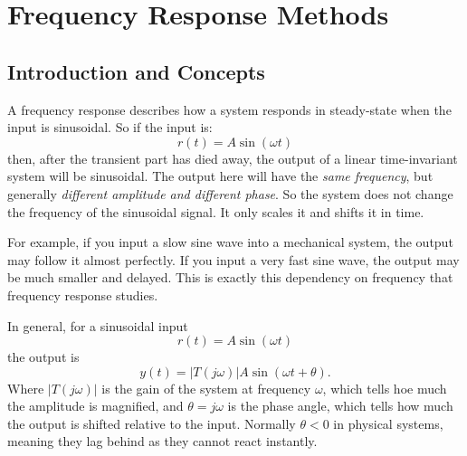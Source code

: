 
\section{Frequency Response Methods}

\subsection{Introduction and Concepts}
A frequency response describes how a system responds in steady-state when the input is sinusoidal.
So if the input is:
\begin{equation*}
  r(t) = A \sin \left( \omega t \right)
\end{equation*}
then, after the transient part has died away, the output of a linear time-invariant system will be sinusoidal.
The output here will have the \textit{same frequency}, but generally \textit{different amplitude and different phase}.
So the system does not change the frequency of the sinusoidal signal.
It only scales it and shifts it in time.

For example, if you input a slow sine wave into a mechanical system, the output may follow it almost perfectly.
If you input a very fast sine wave, the output may be much smaller and delayed.
This is exactly this dependency on frequency that frequency response studies.

In general, for a sinusoidal input
\begin{equation*}
  r(t) = A \sin (\omega t)
\end{equation*}
the output is
\begin{equation*}
  y(t) = \left| T(j\omega) \right|A \sin (\omega t + \theta)
.\end{equation*}
Where $\left| T(j\omega) \right|$ is the gain of the system at frequency $\omega$, which tells hoe much the amplitude is magnified, and $\theta = j \omega$ is the phase angle, which tells how much the output is shifted relative to the input.
Normally $\theta < 0$ in physical systems, meaning they lag behind as they cannot react instantly.

